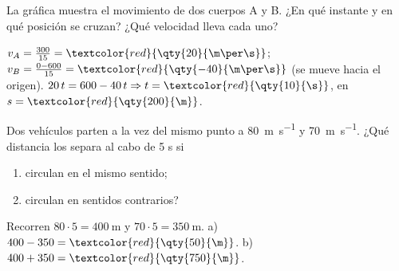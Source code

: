 \begin{exercise}
    La gráfica muestra el movimiento de dos cuerpos A y B. ¿En qué instante y en qué posición se cruzan? ¿Qué velocidad lleva cada uno?
    \begin{center}
    \end{center}
    \begin{solu}
        \(v_A = \frac{300}{15} = \textcolor{red}{\qty{20}{\m\per\s}}\); \(v_B = \frac{0 - 600}{15} = \textcolor{red}{\qty{-40}{\m\per\s}}\) (se mueve hacia el origen).
        \(20\,t = 600 - 40\,t \Rightarrow t = \textcolor{red}{\qty{10}{\s}}\), en \(s = \textcolor{red}{\qty{200}{\m}}\).
    \end{solu}
\end{exercise}

\begin{exercise}
    Dos vehículos parten a la vez del mismo punto a \qty{80}{\m\per\s} y \qty{70}{\m\per\s}. ¿Qué distancia los separa al cabo de 5 s si
    \begin{enumerate}[label=\alph*)]
        \item circulan en el mismo sentido;
        \item circulan en sentidos contrarios?
    \end{enumerate}
    \begin{solu}
        Recorren \(80 \cdot 5 = \qty{400}{\m}\) y \(70 \cdot 5 = \qty{350}{\m}\).
        a) \(400 - 350 = \textcolor{red}{\qty{50}{\m}}\). b) \(400 + 350 = \textcolor{red}{\qty{750}{\m}}\).
    \end{solu}
\end{exercise}

